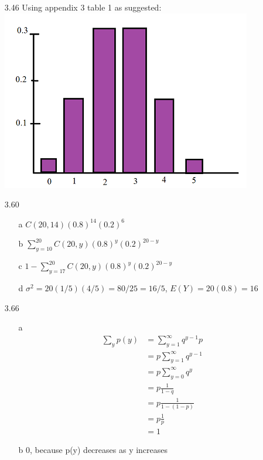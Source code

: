 \documentclass[11pt]{article}
\begin{document}
\begin{enumerate}
        \item[3.46] Using appendix 3 table 1 as suggested: \\
        \includegraphics{pain.png}

        \newpage

        \item[3.60]
        \begin{enumerate}
            \item[a] $C(20,14)(0.8)^{14}(0.2)^6$
            \item[b] $\sum_{y = 10}^{20} C(20,y)(0.8)^{y}(0.2)^{20 - y}$
            \item[c] $1 - \sum_{y = 17}^{20} C(20,y)(0.8)^{y}(0.2)^{20 - y}$
            \item[d] $\sigma^2 = 20(1/5)(4/5) = 80/25 = 16/5$, $E(Y) = 20(0.8) = 16$
        \end{enumerate}

        \item[3.66]
        \begin{enumerate}
            \item[a]
            \begin{align*}
                \sum_{y} p(y) &= \sum_{y=1}^{\infty} q^{y - 1}p \\
                &= p \sum_{y=1}^{\infty} q^{y - 1} \\
                &= p \sum_{y=0}^{\infty} q^{y} \\
                &= p \frac{1}{1-q} \\
                &= p \frac{1}{1-(1 - p)} \\
                &= p \frac{1}{p} \\
                &= 1
            \end{align*}
            \item[b] 0, because p(y) decreases as y increases
        \end{enumerate}


\end{enumerate}
\end{document}
